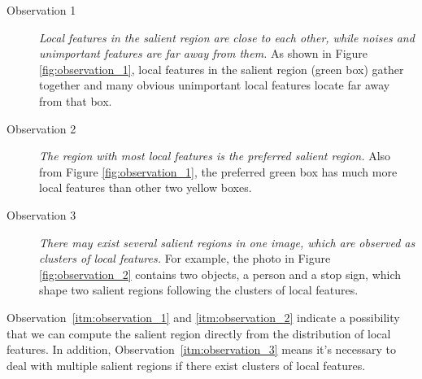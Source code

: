 \begin{description}
	
	\item[Observation 1]  \textit{Local features in the salient region are close to each other, while noises and unimportant features are far away from them.} As shown in Figure \ref{fig:observation_1}, local features in the salient region (green box) gather together and many obvious unimportant local features locate far away from that box. 

	\item[Observation 2]  \textit{The region with most local features is the preferred salient region.} Also from Figure \ref{fig:observation_1}, the preferred green box has much more local features than other two yellow boxes. 

	\item[Observation 3]  \textit{There may exist several salient regions in one image, which are observed as clusters of local features.} For example, the photo in Figure \ref{fig:observation_2} contains two objects, a person and a stop sign, which shape two salient regions following the clusters of local features.

\end{description}

Observation~\ref{itm:observation_1} and \ref{itm:observation_2} indicate a possibility that we can compute the salient region directly from the distribution of local features. In addition, Observation~\ref{itm:observation_3} means it's necessary to deal with multiple salient regions if there exist clusters of local features.
